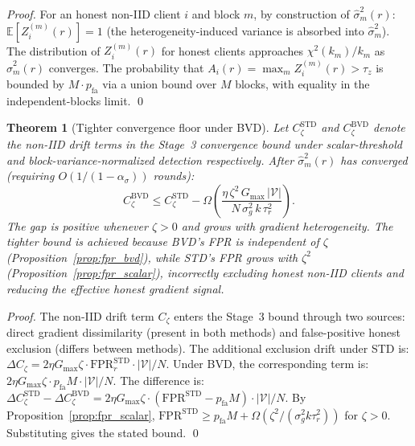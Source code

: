 \documentclass{article}
\newtheorem{theorem}{Theorem}
\newcommand{\E}{\mathbb{E}}
\newcommand{\calV}{\mathcal{V}}
\begin{document}
\begin{proof}
For an honest non-IID client $i$ and block $m$, by construction of
$\hat\sigma_m^2(r)$:
$\E[Z_i^{(m)}(r)] = 1$ (the heterogeneity-induced variance is absorbed into
$\hat\sigma_m^2$).
The distribution of $Z_i^{(m)}(r)$ for honest clients approaches $\chi^2(k_m)/k_m$
as $\hat\sigma_m^2(r)$ converges.
The probability that $A_i(r) = \max_m Z_i^{(m)}(r) > \tau_z$ is bounded by
$M \cdot p_{\mathrm{fa}}$ via a union bound over $M$ blocks, with equality
in the independent-blocks limit.
\qed
\end{proof}

\begin{theorem}[Tighter convergence floor under BVD]
\label{thm:comparison}
Let $C_\zeta^{\mathrm{STD}}$ and $C_\zeta^{\mathrm{BVD}}$ denote the
non-IID drift terms in the Stage~3 convergence bound under scalar-threshold
and block-variance-normalized detection respectively.
After $\hat\sigma_m^2(r)$ has converged (requiring $O(1/(1-\alpha_\sigma))$ rounds):
\[
  C_\zeta^{\mathrm{BVD}} \leq C_\zeta^{\mathrm{STD}} - \Omega\!\left(
    \frac{\eta\,\zeta^2\, G_{\max}\, |\calV|}{N\,\sigma_g^2\,k\,\tau_r^2}
  \right).
\]
The gap is positive whenever $\zeta > 0$ and grows with gradient
heterogeneity.
The tighter bound is achieved because BVD's FPR is independent of $\zeta$
(Proposition~\ref{prop:fpr_bvd}), while STD's FPR grows with $\zeta^2$
(Proposition~\ref{prop:fpr_scalar}), incorrectly excluding honest non-IID
clients and reducing the effective honest gradient signal.
\end{theorem}

\begin{proof}
The non-IID drift term $C_\zeta$ enters the Stage~3 bound through two sources:
direct gradient dissimilarity (present in both methods) and false-positive
honest exclusion (differs between methods).
The additional exclusion drift under STD is:
$\Delta C_\zeta = 2\eta G_{\max} \zeta \cdot \mathrm{FPR}_r^{\mathrm{STD}} \cdot |\calV| / N$.
Under BVD, the corresponding term is:
$2\eta G_{\max} \zeta \cdot p_{\mathrm{fa}} M \cdot |\calV| / N$.
The difference is:
$\Delta C_\zeta^{\mathrm{STD}} - \Delta C_\zeta^{\mathrm{BVD}}
= 2\eta G_{\max} \zeta \cdot (\mathrm{FPR}^{\mathrm{STD}} - p_{\mathrm{fa}} M) \cdot |\calV| / N$.
By Proposition~\ref{prop:fpr_scalar}, $\mathrm{FPR}^{\mathrm{STD}} \geq p_{\mathrm{fa}} M
+ \Omega(\zeta^2 / (\sigma_g^2 k \tau_r^2))$ for $\zeta > 0$.
Substituting gives the stated bound.
\qed
\end{proof}
\end{document}
